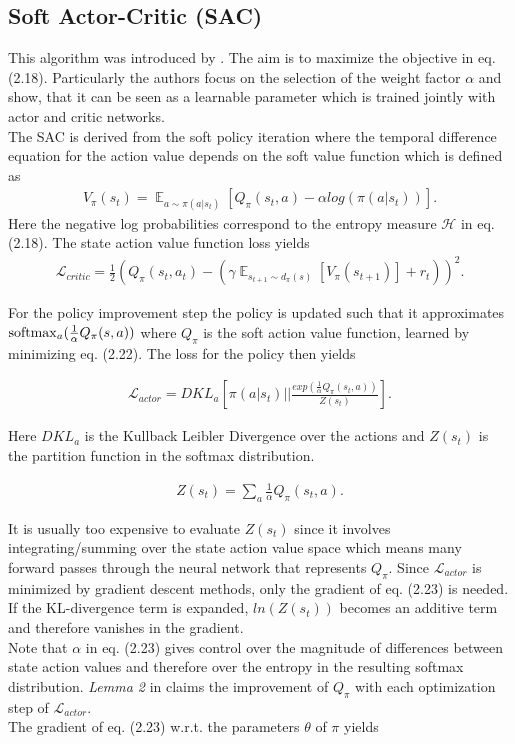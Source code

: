 \subsection{Soft Actor-Critic (SAC)}\label{ssec:sac}
This algorithm was introduced by \cite{haarnoja2018soft}. The aim is to maximize the objective in eq. (2.18). Particularly the authors focus on the selection of the weight factor $\alpha$ and show, that it can be seen as a learnable parameter which is trained jointly with actor and critic networks.\\
The SAC is derived from the soft policy iteration where the temporal difference equation for the action value depends on the soft value function which is defined as
\begin{align}
	V_{\pi}(s_t) = \mathop{\mathbb{E}}_{a \sim \pi(a|s_t)} \left[ Q_{\pi}(s_t, a) - \alpha log( \pi(a|s_t)) \right].
\end{align}
Here the negative log probabilities correspond to the entropy measure $\mathcal{H}$ in eq. (2.18). The state action value function loss yields
\begin{align}
	\mathcal{L}_{critic} = \frac{1}{2}(Q_{\pi}(s_t, a_t) - (\gamma \mathop{\mathbb{E}}_{s_{t+1} \sim d_{\pi}(s)} \left[ V_{\pi}(s_{t+1})\right] + r_t)) ^ 2.
\end{align}

For the policy improvement step the policy is updated such that it approximates $\operatorname*{softmax}_a(\frac{1}{\alpha}Q_{\pi}(s, a))$ where $Q_{\pi}$ is the soft action value function, learned by minimizing eq. (2.22). The loss for the policy then yields

\begin{align}
\mathcal{L}_{actor} = DKL_{a}\left[ \pi(a| s_t) \bigg|\bigg| \frac{exp(\frac{1}{\alpha} Q_{\pi}(s_t, a))}{Z(s_t)} \right].
\end{align}

Here $DKL_{a}$ is the Kullback Leibler Divergence over the actions and $Z(s_t)$ is the partition function in the softmax distribution. 

\begin{align}
	Z(s_t) = \sum_a \frac{1}{\alpha}Q_{\pi} (s_t, a) .
\end{align}

It is usually too expensive to evaluate $Z(s_t)$ since it involves integrating/summing over the state action value space which means many forward passes through the neural network that represents $Q_{\pi}$. Since $\mathcal{L}_{actor}$ is minimized by gradient descent methods, only the gradient of eq. (2.23) is needed. If the KL-divergence term is expanded, $ln(Z(s_t))$ becomes an additive term and therefore vanishes in the gradient.\\
Note that $\alpha$ in eq. (2.23) gives control over the magnitude of differences between state action values and therefore over the entropy in the resulting softmax distribution. \emph{Lemma 2} in \cite{haarnoja2018soft} claims the improvement of $Q_{\pi}$ with each optimization step of $\mathcal{L}_{actor}$.\\
The gradient of eq. (2.23) w.r.t. the parameters $\theta$ of $\pi$ yields

